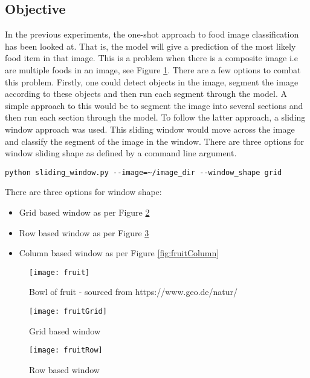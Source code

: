 \subsection*{Objective}
In the previous experiments, the one-shot approach to food image
classification has been looked at. That is, the model will give a prediction of the most likely
food item in that image. This is a problem when there is a composite image i.e are multiple foods in an
image, see Figure \ref{fig:fruit}. There are a few options to combat this problem. Firstly, one could detect
objects in the image, segment the image according to these objects and then run
each segment through the model.
A simple approach to this would be to segment
the image into several sections and then run each section through the model.
To follow the latter approach, a sliding window approach was used. This
sliding window would move across the image and classify the segment of the image
in the window. There are three options for window sliding shape as defined by a
command line argument.

\begin{lstlisting}[style=Command]
python sliding_window.py --image=~/image_dir --window_shape grid
\end{lstlisting}

There are three options for window shape:
\begin{itemize}
	\item{Grid based window as per Figure \ref{fig:fruitGrid}}
	\item{Row based window as per Figure \ref{fig:fruitRow}}
	\item{Column based window as per Figure \ref{fig:fruitColumn}}
\end{itemize}

\begin{figure}
\centering
    \texttt{[image: fruit]}
    \caption{Bowl of fruit - sourced from https://www.geo.de/natur/}
    \label{fig:fruit}
\end{figure}

\begin{figure}
\centering
    \texttt{[image: fruitGrid]}
	\caption{Grid based window}
    \label{fig:fruitGrid}
\end{figure}

\begin{figure}
\centering
    \texttt{[image: fruitRow]}
    \caption{Row based window}
    \label{fig:fruitRow}
\end{figure}

